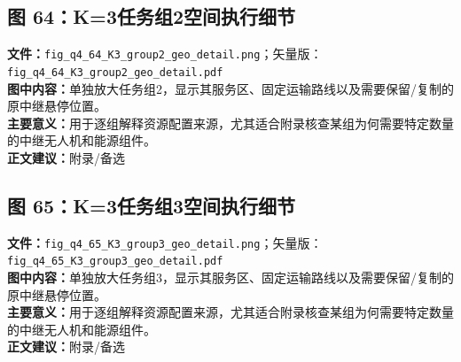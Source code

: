 \subsection*{图 64：K=3任务组2空间执行细节}
\textbf{文件：}\texttt{fig\_q4\_64\_K3\_group2\_geo\_detail.png}；矢量版：\texttt{fig\_q4\_64\_K3\_group2\_geo\_detail.pdf}\\
\textbf{图中内容：}单独放大任务组2，显示其服务区、固定运输路线以及需要保留/复制的原中继悬停位置。\\
\textbf{主要意义：}用于逐组解释资源配置来源，尤其适合附录核查某组为何需要特定数量的中继无人机和能源组件。\\
\textbf{正文建议：}附录/备选

\subsection*{图 65：K=3任务组3空间执行细节}
\textbf{文件：}\texttt{fig\_q4\_65\_K3\_group3\_geo\_detail.png}；矢量版：\texttt{fig\_q4\_65\_K3\_group3\_geo\_detail.pdf}\\
\textbf{图中内容：}单独放大任务组3，显示其服务区、固定运输路线以及需要保留/复制的原中继悬停位置。\\
\textbf{主要意义：}用于逐组解释资源配置来源，尤其适合附录核查某组为何需要特定数量的中继无人机和能源组件。\\
\textbf{正文建议：}附录/备选
